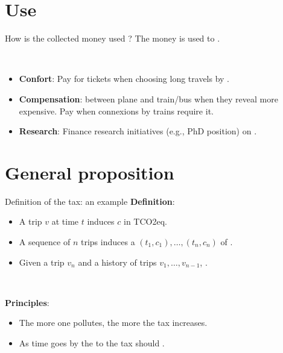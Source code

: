 \documentclass[french, english]{beamer}
\begin{document}
\section{Use}
\begin{frame}{How is the collected money used ?}
The money is used to .

\

\begin{itemize} 
    \item \textbf{Confort}: Pay for  tickets when choosing long travels by . 
    \item \textbf{Compensation}:  between plane and train/bus when they reveal more expensive.  Pay  when connexions by trains require it.
    \item \textbf{Research}: Finance research initiatives (e.g., PhD position) on .
\end{itemize}	
\end{frame}

\section{General proposition}
\begin{frame}{Definition of the tax: an example}
\textbf{Definition}:
\begin{itemize}
\item A trip $v$ at time $t$ induces  $c$ in TCO2eq.
\item A sequence of $n$ trips induces a  $(t_1, c_1),\ldots,(t_n,c_n)$ of .
\item Given a trip $v_n$ and a history of trips $v_1,\ldots, v_{n-1}$, .  
\end{itemize}

\

\textbf{Principles}:
\begin{itemize}
\item The more one pollutes, the more the tax increases. 
\item As time goes by the  to the tax should .
\end{itemize}
\end{frame}
\end{document}
